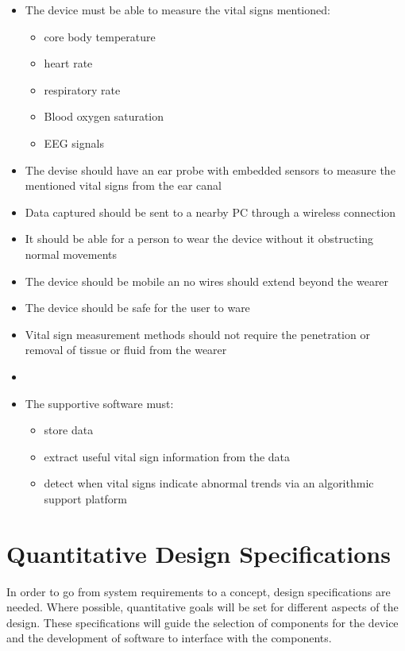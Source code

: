 \begin{itemize}
	\item The device must be able to measure the vital signs mentioned:
	\begin{itemize}
		\item core body temperature
		\item heart rate
		\item respiratory rate
		\item Blood oxygen saturation
		\item EEG signals
	\end{itemize}  
	\item  The devise should have an ear probe with embedded sensors to measure the mentioned vital signs from the ear canal
	\item Data captured should be sent to a nearby PC through a wireless connection
	\item It should be able for a person to wear the device without it obstructing normal movements
	\item The device should be mobile an no wires should extend beyond the wearer
	\item The device should be safe for the user to ware
	\item Vital sign measurement methods should not require the penetration or removal of tissue or fluid from the wearer
	\item 
  	\item The supportive software must:
  	\begin{itemize}
  		\item store data
  		\item extract useful vital sign information from the data
  		\item detect when vital signs indicate abnormal trends via an 	 			algorithmic support platform
  	\end{itemize}
\end{itemize}

\section{Quantitative Design Specifications}
In order to go from system requirements to a concept, design specifications are needed. Where possible, quantitative goals will be set for different aspects of the design. These specifications will guide the selection of components for the device and the development of software to interface with the components.

